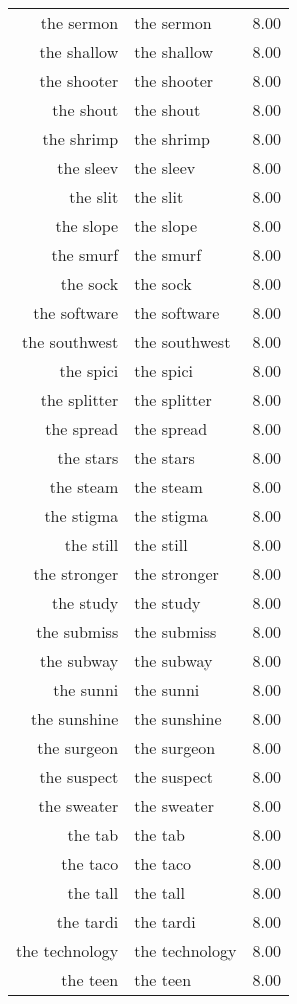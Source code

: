 \begin{table}[ht]
\begin{tabular}{rlr}
  the sermon & the sermon & 8.00 \\ 
  the shallow & the shallow & 8.00 \\ 
  the shooter & the shooter & 8.00 \\ 
  the shout & the shout & 8.00 \\ 
  the shrimp & the shrimp & 8.00 \\ 
  the sleev & the sleev & 8.00 \\ 
  the slit & the slit & 8.00 \\ 
  the slope & the slope & 8.00 \\ 
  the smurf & the smurf & 8.00 \\ 
  the sock & the sock & 8.00 \\ 
  the software & the software & 8.00 \\ 
  the southwest & the southwest & 8.00 \\ 
  the spici & the spici & 8.00 \\ 
  the splitter & the splitter & 8.00 \\ 
  the spread & the spread & 8.00 \\ 
  the stars & the stars & 8.00 \\ 
  the steam & the steam & 8.00 \\ 
  the stigma & the stigma & 8.00 \\ 
  the still & the still & 8.00 \\ 
  the stronger & the stronger & 8.00 \\ 
  the study & the study & 8.00 \\ 
  the submiss & the submiss & 8.00 \\ 
  the subway & the subway & 8.00 \\ 
  the sunni & the sunni & 8.00 \\ 
  the sunshine & the sunshine & 8.00 \\ 
  the surgeon & the surgeon & 8.00 \\ 
  the suspect & the suspect & 8.00 \\ 
  the sweater & the sweater & 8.00 \\ 
  the tab & the tab & 8.00 \\ 
  the taco & the taco & 8.00 \\ 
  the tall & the tall & 8.00 \\ 
  the tardi & the tardi & 8.00 \\ 
  the technology & the technology & 8.00 \\ 
  the teen & the teen & 8.00 \\ 

\end{tabular}
\end{table}
